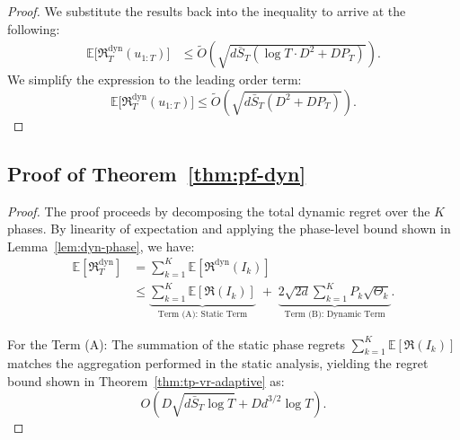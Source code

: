 \documentclass[journal,onecolumn]{IEEEtran}
\theoremstyle{plain}
\theoremstyle{definition}
\theoremstyle{remark}
\newcommand{\regret}{\mathfrak{R}}
\begin{document}
{\begin{proof}
We substitute the results back into the inequality to arrive at the following:
\begin{align*}
\mathbb{E}\bigl[\regret_T^{\mathrm{dyn}}(u_{1:T})\bigr] 
&\le \widetilde{O}\left( \sqrt{d\bar{S}_T (\log T \cdot D^2 + D P_T)} \right).
\end{align*}
We simplify the expression to the leading order term:
\begin{equation*}
\mathbb{E}\bigl[\regret_T^{\mathrm{dyn}}(u_{1:T})\bigr] \le \widetilde{O}\left( \sqrt{d \bar{S}_T (D^2 + D P_T)} \right).
\end{equation*}

\end{proof}


\iffalse
\subsection{Proof of Theorem~\ref{thm:pf-dyn}}
\begin{proof}
    The proof proceeds by decomposing the total dynamic regret over the $K$ phases.
    By linearity of expectation and applying the phase-level bound shown in
    Lemma~\ref{lem:dyn-phase}, we have:
    \begin{align*}
        \mathbb{E}[\regret_{T}^{\mathrm{dyn}}] & = \sum_{k=1}^{K} \mathbb{E}[\regret^{\mathrm{dyn}}(I_{k})]\\
        & \le \underbrace{\sum_{k=1}^K \mathbb{E}[\regret(I_k)]}_{\text{Term (A): Static Term}}\;+\; \underbrace{2\sqrt{2d} \sum_{k=1}^K P_k \sqrt{\Theta_{k}}}_{\text{Term (B): Dynamic Term}}.
    \end{align*}

    For the Term (A): The summation of the static phase regrets
    $\sum_{k=1}^{K} \mathbb{E}[\mathfrak{R}(I_{k})]$ matches the aggregation
    performed in the static analysis, yielding the regret bound shown in Theorem~\ref{thm:tp-vr-adaptive}
    as:
    \begin{equation*}
        O\left(D\sqrt{d\bar S_{T}\log T}+ Dd^{3/2}\log T\right).
    \end{equation*}


\end{proof}}
\end{document}
